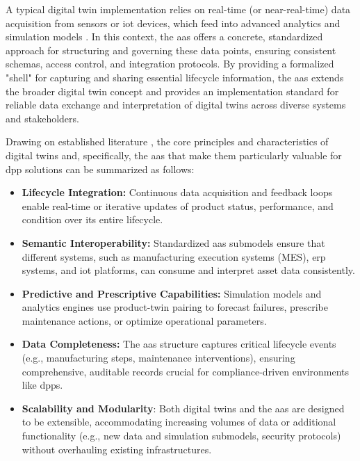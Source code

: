 A typical digital twin implementation relies on real-time (or near-real-time) data acquisition from sensors or \ac{iot} devices, which feed into advanced analytics and simulation models \autocite{Kritzinger.2018}. In this context, the \acrlong{aas} offers a concrete, standardized approach for structuring and governing these data points, ensuring consistent schemas, access control, and integration protocols. By providing a formalized "shell" for capturing and sharing essential lifecycle information, the \ac{aas} extends the broader digital twin concept and provides an implementation standard for reliable data exchange and interpretation of digital twins across diverse systems and stakeholders. \autocite{PlattformIndustrie4.0.2022}

Drawing on established literature \textcite{PlattformIndustrie4.0.2022, Tao.2018b, Grieves.2014}, the core principles and characteristics of digital twins and, specifically, the \ac{aas} that make them particularly valuable for \ac{dpp} solutions can be summarized as follows:

\begin{itemize}[itemsep=0.5\baselineskip]
    \item \textbf{Lifecycle Integration:} Continuous data acquisition and feedback loops enable real-time or iterative updates of product status, performance, and condition over its entire lifecycle. \autocite{Kritzinger.2018}

    \item \textbf{Semantic Interoperability:} Standardized \ac{aas} submodels ensure that different systems, such as manufacturing execution systems (MES), \ac{erp} systems, and \ac{iot} platforms, can consume and interpret asset data consistently. \autocite{PlattformIndustrie4.0.2016, PlattformIndustrie4.0.2022, Bader.2020}

    \item \textbf{Predictive and Prescriptive Capabilities:} Simulation models and analytics engines use product-twin pairing to forecast failures, prescribe maintenance actions, or optimize operational parameters. \autocite{Tao.2018b, Fuller.2020}

    \item \textbf{Data Completeness:} The \ac{aas} structure captures critical lifecycle events (e.g., manufacturing steps, maintenance interventions), ensuring comprehensive, auditable records crucial for compliance-driven environments like \ac{dpp}s. \autocite{PlattformIndustrie4.0.2022}
    
    \item \textbf{Scalability and Modularity}: Both digital twins and the \ac{aas} are designed to be extensible, accommodating increasing volumes of data or additional functionality (e.g., new data and simulation submodels, security protocols) without overhauling existing infrastructures. \autocite{Bader.2020}
\end{itemize}

